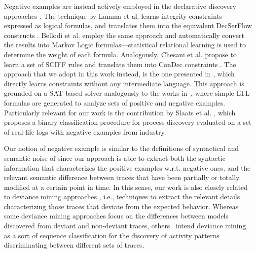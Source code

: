 Negative examples are instead actively employed in the declarative discovery approaches \cite{2007-Lamma,2007b-Lamma,2010-Bellodi,2016-Bellodi,2009-Chesani,deviant-tkde,DBLP:conf/bpm/SlaatsDB21}. 
The technique by Lamma et al. \cite{2007-Lamma,2007b-Lamma} learns integrity constraints expressed as logical formulas, and translates them into the equivalent DecSerFlow constructs \cite{2006-Aalst}. 
Bellodi et al. \cite{2010-Bellodi,2016-Bellodi} employ the same approach and automatically convert the results into Markov Logic formulas---statistical relational learning is used to determine the weight of each formula.
Analogously, Chesani et al. \cite{2009-Chesani} propose to learn a set of SCIFF rules \cite{2008-Alberti} and translate them into ConDec constraints \cite{2006-Pesic}. The approach that we adopt in this work instead, is the one presented in \cite{deviant-tkde}, which directly learns \declare constraints without any intermediate language.
This approach is grounded on a SAT-based solver analogously to the works in~\cite{2018-Neider,2019-Camacho,2019-Riener}, where simple \ac{LTL} formulas are generated to analyze sets of positive and negative examples.
Particularly relevant for our work is the contribution by Slaats et al. \cite{DBLP:conf/bpm/SlaatsDB21}, which proposes a binary classification procedure for process discovery  evaluated on a set of real-life logs with negative examples from industry. 


Our notion of negative example is similar to the definitions of syntactical and semantic noise of \cite{2009-Gunther} since our approach is able to extract both the syntactic information that characterizes the positive examples w.r.t. negative ones, and the relevant semantic difference between traces that have been partially or totally modified at a certain point in time.
%
In this sense, our work is also closely related to deviance mining approaches \cite{2016-Nguyen,DBLP:journals/kbs/TaymouriRDM21}, i.e., techniques to extract the relevant details characterizing those traces %
that deviate from the expected behavior. Whereas some deviance mining approaches \cite{2014-Suriadi,2014-Armas} focus on the differences between models discovered from deviant and non-deviant traces, others~\cite{2013-Suriadi,2015-Partington,2013-Bose,2007-Lo,DBLP:journals/corr/abs-2111-12454} intend deviance mining as a sort of sequence classification for the discovery of activity patterns discriminating between different sets of traces. %

